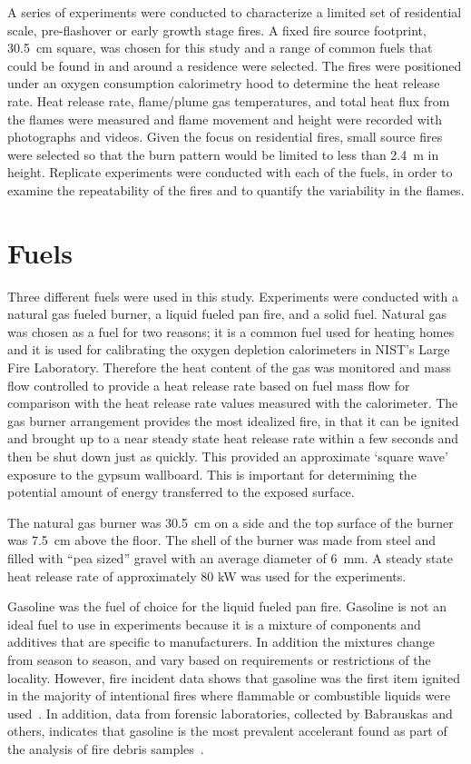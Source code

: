\documentclass[twoside]{uocthesis}
\begin{document}
{A series of experiments were conducted to characterize a limited set of  residential scale, pre-flashover or early growth stage fires.  A fixed fire source footprint, 30.5~cm square, was chosen for this study and a range of common fuels that could be found in and around a residence were selected.  The fires were positioned under an oxygen consumption calorimetry hood to determine the heat release rate.  Heat release rate, flame/plume gas temperatures, and total heat flux from the flames were measured and flame movement and height were recorded with photographs and videos.  Given the focus on residential fires, small source fires were selected so that the burn pattern would be limited to less than 2.4~m in height.  Replicate experiments were conducted with each of the fuels, in order to examine the repeatability of the fires and to quantify the variability in the flames.

\section{Fuels}

Three different fuels were used in this study.  Experiments were conducted with a natural gas fueled burner, a liquid fueled pan fire, and a solid fuel. Natural gas was chosen as a fuel for two reasons; it is a common fuel used for heating homes and it is used for calibrating the oxygen depletion calorimeters in NIST’s Large Fire Laboratory.  Therefore the heat content of the gas was monitored and mass flow controlled to provide a heat release rate based on fuel mass flow for comparison with the heat release rate values measured with the calorimeter.  The gas burner arrangement provides the most idealized fire, in that it can be ignited and brought up to a near steady state heat release rate within a few seconds and then be shut down just as quickly.  This provided an approximate `square wave' exposure to the gypsum wallboard.  This is important for determining the potential amount of energy transferred to the exposed surface.

The natural gas burner was 30.5~cm on a side and the top surface of the burner was 7.5~cm above the floor. The shell of the burner was made from steel and filled with ``pea sized'' gravel with an average diameter of 6~mm.  A steady state heat release rate of approximately 80 kW was used for the experiments.

Gasoline was the fuel of choice for the liquid fueled pan fire.  Gasoline is not an ideal fuel to use in experiments because it is a mixture of components and additives that are specific to manufacturers. In addition the mixtures change from season to season, and vary based on requirements or restrictions of the locality.  However, fire incident data shows that gasoline was the first item ignited in the majority of intentional fires where flammable or combustible liquids were used~\cite{Rohr:2001}. In addition, data from forensic laboratories, collected by Babrauskas and others, indicates that gasoline is the most prevalent accelerant found as part of the analysis of fire debris samples~\cite{Babrauskas:2003,Chasteen:2010}.

}
\end{document}
